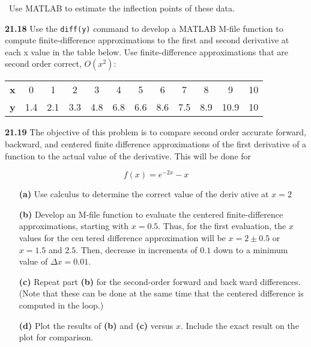 \begin{multicols}{2}
\begin{tabular}{lccccc}
\hline
\end{tabular}\
Use MATLAB to estimate the inflection points of these data.

\textbf{21.18} Use the \texttt{diff(y)}  command to develop a MATLAB
M-file function to compute finite-difference approximations
to the first and second derivative at each x value in the table
below. Use finite-difference approximations that are second order correct, $O (x^{2})$:\\
\begin{tabular}{lccccccccccc}
\hline

	\tiny{\textbf{x}} & \tiny{0} & \tiny{1} & \tiny{2} & \tiny{3} & \tiny{4} & \tiny{5} & \tiny{6} & \tiny{7} & \tiny{8} & \tiny{9} & \tiny{10}\\
	
	\tiny{\textbf{y}} & \tiny{1.4} & \tiny{2.1} & \tiny{3.3} & \tiny{4.8} & \tiny{6.8} & \tiny{6.6} & \tiny{8.6} & \tiny{7.5} & \tiny{8.9} & \tiny{10.9} & \tiny{10}\\

\hline
\end{tabular}

\textbf{21.19} The objective of this problem is to compare secondorder accurate forward, backward, and centered finitedifference approximations of the first derivative of a function
to the actual value of the derivative. This will be done for

	$$f(x) = e^{-2x} - x$$

\begin{enumerate}
	\item[\textbf{(a)}] Use calculus to determine the correct value of the derivative at $x = 2$
	
	\item[\textbf{(b)}] Develop an M-file function to evaluate the centered
finite-difference approximations, starting with $x=0.5$. Thus, for the first evaluation, the $x$ values for the centered difference approximation will be $x = 2 \pm 0.5$ or
$x = 1.5$ and $2.5$. Then, decrease in increments of $0.1$
down to a minimum value of $\Delta x = 0.01$.

	\item[\textbf{(c)}] Repeat part \textbf{(b)} for the second-order forward and backward differences. (Note that these can be done at the same
time that the centered difference is computed in the loop.)
 
	\item[\textbf{(d)}] Plot the results of \textbf{(b)} and \textbf{(c)} versus $x$. Include the exact
result on the plot for comparison. 
\end{enumerate}


\end{multicols}

